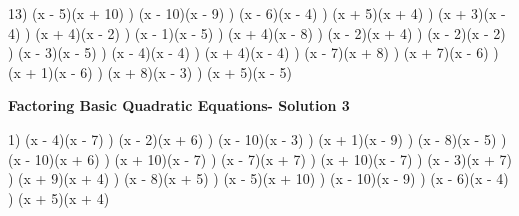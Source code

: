 \documentclass{article}%
\begin{document}
13) (x - 5)(x + 10)%
) (x - 10)(x - 9)%
) (x - 6)(x - 4)%
) (x + 5)(x + 4)%
) (x + 3)(x - 4)%
) (x + 4)(x - 2)%
) (x - 1)(x - 5)%
) (x + 4)(x - 8)%
) (x - 2)(x + 4)%
) (x - 2)(x - 2)%
) (x - 3)(x - 5)%
) (x - 4)(x - 4)%
) (x + 4)(x - 4)%
) (x - 7)(x + 8)%
) (x + 7)(x - 6)%
) (x + 1)(x - 6)%
) (x + 8)(x - 3)%
) (x + 5)(x - 5)%
\newline%
\newpage%
\large%
\begin{center}%
\textbf{Factoring Basic Quadratic Equations- Solution 3}%
\newline%
\end{center} \normalsize%
1) (x - 4)(x - 7)%
) (x - 2)(x + 6)%
) (x - 10)(x - 3)%
) (x + 1)(x - 9)%
) (x - 8)(x - 5)%
) (x - 10)(x + 6)%
) (x + 10)(x - 7)%
) (x - 7)(x + 7)%
) (x + 10)(x - 7)%
) (x - 3)(x + 7)%
) (x + 9)(x + 4)%
) (x - 8)(x + 5)%
) (x - 5)(x + 10)%
) (x - 10)(x - 9)%
) (x - 6)(x - 4)%
) (x + 5)(x + 4)%
\newline%
\end{document}
